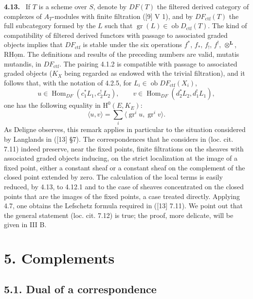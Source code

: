 \documentclass[11pt]{article}
\newenvironment{statement}[1]{\par\medskip\noindent\textbf{#1.}\ }{\par\medskip}
\renewcommand{\H}{\mathrm{H}}
\DeclareMathOperator{\Hom}{Hom}
\newcommand{\ob}{\operatorname{ob}}
\providecommand{\Dctf}{D_{\mathrm{ctf}}}
\providecommand{\ctf}{\mathrm{ctf}}
\providecommand{\gr}{\operatorname{gr}}
\providecommand{\Dctf}{D_{\mathrm{ctf}}}
\providecommand{\Hom}{\operatorname{Hom}}
\providecommand{\ob}{\operatorname{ob}}
\providecommand{\gr}{\operatorname{gr}}
\providecommand{\gr}{\operatorname{gr}}
\providecommand{\Hom}{\operatorname{Hom}}
\begin{document}
\begin{statement}{4.13}
If $T$ is a scheme over $S$, denote by $DF(T)$ the filtered derived category of complexes of $A_T$-modules with finite filtration ([9] V 1), and by $DF_{\ctf}(T)$ the full subcategory formed by the $L$ such that $\gr(L)\in\ob\Dctf(T)$. The kind of compatibility of filtered derived functors with passage to associated graded objects implies that $DF_{\ctf}$ is stable under the six operations $f^*$, $f_*$, $f_!$, $f^!$, $\otimes^{\mathbf L}$, $\mathrm{R}\underline{\mathrm{Hom}}$. The definitions and results of the preceding numbers are valid, mutatis mutandis, in $DF_{\ctf}$. The pairing 4.1.2 is compatible with passage to associated graded objects ($K_X$ being regarded as endowed with the trivial filtration), and it follows that, with the notation of 4.2.5, for $L_i\in\ob DF_{\ctf}(X_i)$,
\[
u\in\Hom_{DF}(c_1^*L_1,c_2^!L_2),\qquad
v\in\Hom_{DF}(d_2^*L_2,d_1^!L_1),
\]
one has the following equality in $\H^0(E,K_E)$:
\begin{equation}
\tag{4.13.1}
\langle u,v\rangle=\sum_i\langle \gr^i u,\gr^i v\rangle.
\end{equation}
As Deligne observes, this remark applies in particular to the situation considered by Langlands in ([13] §7). The correspondences that he considers in (loc. cit. 7.11) indeed preserve, near the fixed points, finite filtrations on the sheaves with associated graded objects inducing, on the strict localization at the image of a fixed point, either a constant sheaf or a constant sheaf on the complement of the closed point extended by zero. The calculation of the local terms is easily reduced, by 4.13, to 4.12.1 and to the case of sheaves concentrated on the closed points that are the images of the fixed points, a case treated directly. Applying 4.7, one obtains the Lefschetz formula required in ([13] 7.11). We point out that the general statement (loc. cit. 7.12) is true; the proof, more delicate, will be given in III B.
\end{statement}



\section*{5. Complements}

\subsection*{5.1. Dual of a correspondence}
\end{document}
